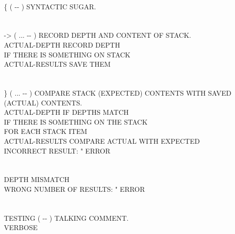 \begin{tt}
\\
\word{:} \{ \tab[2.8]  ( -{}- ) SYNTACTIC SUGAR.\\
\tab \word{;} \\
\\
\word{:} -> \tab[2.2]  ( ... -{}- ) RECORD DEPTH AND CONTENT OF STACK.\\
\tab {}  ACTUAL-DEPTH \word{!}				\tab[5.9]   RECORD DEPTH\\
\tab {} 										\tab[16.1]  IF THERE IS SOMETHING ON STACK\\
  ACTUAL-RESULTS   \word{+} \word{!}  \tab[.6]  SAVE THEM\\
\tab {} \word{;} \\
\\
\word{:} \} \tab[2.8]  ( ... -{}- ) COMPARE STACK (EXPECTED) CONTENTS WITH SAVED\\
\tab[5.2]  (ACTUAL) CONTENTS.\\
\tab {} ACTUAL-DEPTH  \word{=} 		\tab[4.85]   IF DEPTHS MATCH\\
\tab[2]   						\tab[9.05]  IF THERE IS SOMETHING ON THE STACK\\
 											\tab[14.8]  FOR EACH STACK ITEM\\
\tab[4]			 ACTUAL-RESULTS   \word{+} 	\tab[.6]  COMPARE ACTUAL WITH EXPECTED\\
\tab[4]			   INCORRECT RESULT: " ERROR  \\
\tab[3]		\\
\tab[2] \\
\tab {}												\tab[17.4]  DEPTH MISMATCH\\
\tab[2]  WRONG NUMBER OF RESULTS: " ERROR\\
\tab {} \word{;} \\
\\
\word{:} TESTING \tab[.65]  ( -{}- ) TALKING COMMENT.\\
\tab {} VERBOSE  \\
\tab {}       \word{!}\\
\tab {}  \word{!} \\
\tab {} \word{;}
\end{tt}

